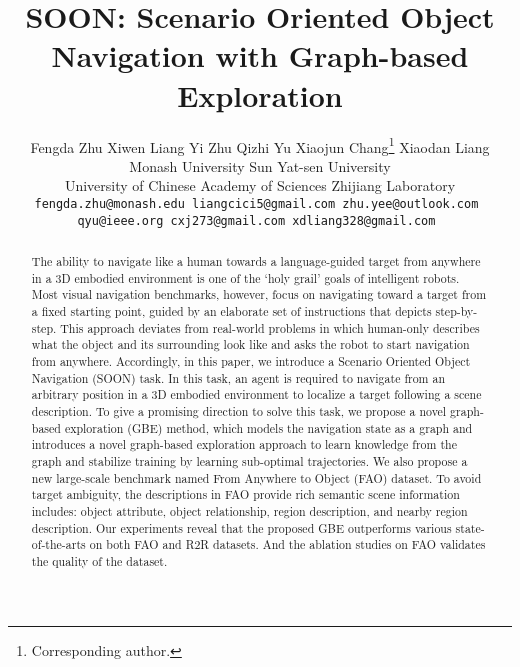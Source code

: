 \documentclass[final]{cvpr}
\begin{document}
\title{SOON: Scenario Oriented Object Navigation with Graph-based Exploration}


\author{Fengda Zhu\hspace{6mm}
Xiwen Liang\hspace{6mm}
Yi Zhu\hspace{6mm}
Qizhi Yu \hspace{6mm}
Xiaojun Chang\thanks{Corresponding author.} \hspace{6mm}
Xiaodan Liang \\
Monash University \hspace{2mm}  Sun Yat-sen University \\  University of Chinese Academy of Sciences \hspace{2mm} Zhijiang Laboratory\\
{\tt\small fengda.zhu@monash.edu \hspace{2mm} liangcici5@gmail.com \hspace{2mm} zhu.yee@outlook.com } \\
{\tt\small qyu@ieee.org \hspace{2mm} cxj273@gmail.com \hspace{2mm} xdliang328@gmail.com }
}

\maketitle
\pagestyle{empty}
\thispagestyle{empty}

\begin{abstract}
   The ability to navigate like a human towards a language-guided target from anywhere in a 3D embodied environment is one of the `holy grail' goals of intelligent robots. Most visual navigation benchmarks, however, focus on navigating toward a target from a fixed starting point, guided by an elaborate set of instructions that depicts step-by-step. This approach deviates from real-world problems in which human-only describes what the object and its surrounding look like and asks the robot to start navigation from anywhere. Accordingly, in this paper, we introduce a Scenario Oriented Object Navigation (SOON) task. In this task, an agent is required to navigate from an arbitrary position in a 3D embodied environment to localize a target following a scene description. 
   To give a promising direction to solve this task, we propose a novel graph-based exploration (GBE) method, which models the navigation state as a graph and introduces a novel graph-based exploration approach to learn knowledge from the graph and stabilize training by learning sub-optimal trajectories. 
   We also propose a new large-scale benchmark named From Anywhere to Object (FAO) dataset. To avoid target ambiguity, the descriptions in FAO provide rich semantic scene information includes: object attribute, object relationship, region description, and nearby region description. Our experiments reveal that the proposed GBE outperforms various state-of-the-arts on both FAO and R2R datasets. And the ablation studies on FAO validates the quality of the dataset. 
\end{abstract}
\end{document}
